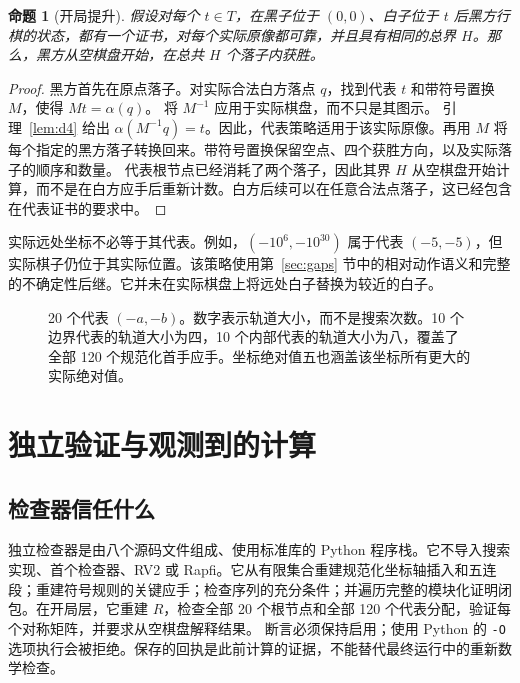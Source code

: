 \documentclass[11pt]{article}
\newtheorem{proposition}[theorem]{命题}
\theoremstyle{definition}
\theoremstyle{remark}
\newcommand{\A}{\alpha}
\newcommand{\code}[1]{\texttt{#1}}
\begin{document}
\begin{proposition}[开局提升]
\label{prop:opening}
假设对每个 $t\in T$，在黑子位于 $(0,0)$、白子位于 $t$ 后黑方行棋的状态，都有一个证书，对每个实际原像都可靠，并且具有相同的总界 $H$。那么，黑方从空棋盘开始，在总共 $H$ 个落子内获胜。
\end{proposition}
\begin{proof}
黑方首先在原点落子。对实际合法白方落点 $q$，找到代表 $t$ 和带符号置换 $M$，使得 $Mt=\A(q)$。
将 $M^{-1}$ 应用于实际棋盘，而不只是其图示。
引理~\ref{lem:d4} 给出 $\A(M^{-1}q)=t$。因此，代表策略适用于该实际原像。再用 $M$ 将每个指定的黑方落子转换回来。带符号置换保留空点、四个获胜方向，以及实际落子的顺序和数量。
代表根节点已经消耗了两个落子，因此其界 $H$ 从空棋盘开始计算，而不是在白方应手后重新计数。白方后续可以在任意合法点落子，这已经包含在代表证书的要求中。
\end{proof}

实际远处坐标不必等于其代表。例如，$(-10^6,-10^{30})$ 属于代表 $(-5,-5)$，但实际棋子仍位于其实际位置。该策略使用第~\ref{sec:gaps} 节中的相对动作语义和完整的不确定性后继。它并未在实际棋盘上将远处白子替换为较近的白子。

\begin{figure}[ht]
\centering
{}
\caption{20 个代表 $(-a,-b)$。数字表示轨道大小，而不是搜索次数。10 个边界代表的轨道大小为四，10 个内部代表的轨道大小为八，覆盖了全部 120 个规范化首手应手。坐标绝对值五也涵盖该坐标所有更大的实际绝对值。}
\label{fig:orbits}
\end{figure}

\section{独立验证与观测到的计算}
\label{sec:compute}
\subsection{检查器信任什么}
独立检查器是由八个源码文件组成、使用标准库的 Python 程序栈。它不导入搜索实现、首个检查器、RV2 或 Rapfi。它从有限集合重建规范化坐标轴插入和五连段；重建符号规则的关键应手；检查序列的充分条件；并遍历完整的模块化证明闭包。在开局层，它重建 $R$，检查全部 20 个根节点和全部 120 个代表分配，验证每个对称矩阵，并要求从空棋盘解释结果。
断言必须保持启用；使用 Python 的 \code{-O} 选项执行会被拒绝。保存的回执是此前计算的证据，不能替代最终运行中的重新数学检查。
\end{document}
